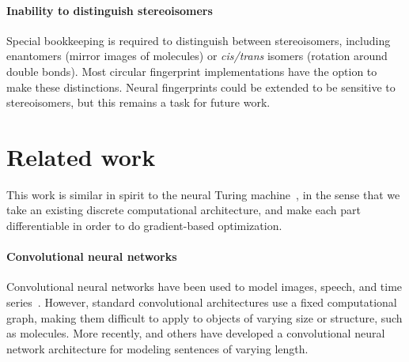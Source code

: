 \documentclass{article}
\newcommand{\citep}{\cite}
\begin{document}
\paragraph{Inability to distinguish stereoisomers}
Special bookkeeping is required to distinguish between stereoisomers, including enantomers (mirror images of molecules) or {\it cis/trans} isomers (rotation around double bonds).
Most circular fingerprint implementations have the option to make these distinctions.
Neural fingerprints could be extended to be sensitive to stereoisomers, but this remains a task for future work.






\section{Related work}
This work is similar in spirit to the neural Turing machine~\citep{graves2014neural}, in the sense that we take an existing discrete computational architecture, and make each part differentiable in order to do gradient-based optimization.

\paragraph{Convolutional neural networks}
Convolutional neural networks have been used to model images, speech, and time series~\citep{lecun1995convolutional}.
However, standard convolutional architectures use a fixed computational graph, making them difficult to apply to objects of varying size or structure, such as molecules.
More recently, \cite{KalchbrennerACL2014} and others have developed a convolutional neural network architecture for modeling sentences of varying length.
\end{document}
